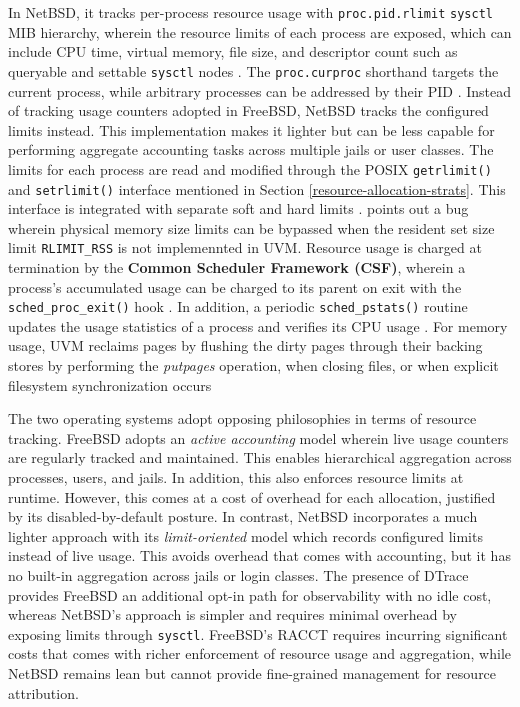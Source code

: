 In NetBSD, it tracks per-process resource usage with \texttt{proc.pid.rlimit} \texttt{sysctl} MIB hierarchy, wherein the resource limits
of each process are exposed, which can include CPU time, virtual memory, file size, and descriptor count such as queryable and settable
\texttt{sysctl} nodes \parencite{netbsd_sysctl}. The \texttt{proc.curproc} shorthand targets the current process, while arbitrary processes
can be addressed by their PID \parencite{netbsd_sysctl}. Instead of tracking usage counters adopted in FreeBSD, NetBSD tracks the configured
limits instead. This implementation makes it lighter but can be less capable for performing aggregate accounting tasks across multiple jails
or user classes. The limits for each process are read and modified through the POSIX \texttt{getrlimit()} and \texttt{setrlimit()} interface
mentioned in Section \ref{resource-allocation-strats}. This interface is integrated with separate soft and hard limits \parencite{netbsd_getrlimit}.
\textcite{netbsd_getrlimit} points out a bug wherein physical memory size limits can be bypassed when the resident set size limit
\texttt{RLIMIT\_RSS} is not implemennted in UVM. Resource usage is charged at termination by the \textbf{Common Scheduler Framework (CSF)},
wherein a process's accumulated usage can be charged to its parent on exit with the \texttt{sched\_proc\_exit()} hook \parencite{netbsd_csf}.
In addition, a periodic \texttt{sched\_pstats()} routine updates the usage statistics of a process and verifies its CPU usage \parencite{netbsd_csf}.
For memory usage, UVM reclaims pages by flushing the dirty pages through their backing stores by performing the \textit{putpages} operation,
when closing files, or when explicit filesystem synchronization occurs \parencite{netbsd_internals}

The two operating systems adopt opposing philosophies in terms of resource tracking. FreeBSD adopts an \textit{active accounting} model
wherein live usage counters are regularly tracked and maintained. This enables hierarchical aggregation across processes, users, and jails.
In addition, this also enforces resource limits at runtime. However, this comes at a cost of overhead for each allocation, justified by its
disabled-by-default posture. In contrast, NetBSD incorporates a much lighter approach with its \textit{limit-oriented} model which records
configured limits instead of live usage. This avoids overhead that comes with accounting, but it has no built-in aggregation across jails or
login classes. The presence of DTrace provides FreeBSD an additional opt-in path for observability with no idle cost, whereas NetBSD's
approach is simpler and requires minimal overhead by exposing limits through \texttt{sysctl}. FreeBSD's RACCT requires incurring significant
costs that comes with richer enforcement of resource usage and aggregation, while NetBSD remains lean but cannot provide fine-grained management
for resource attribution.

